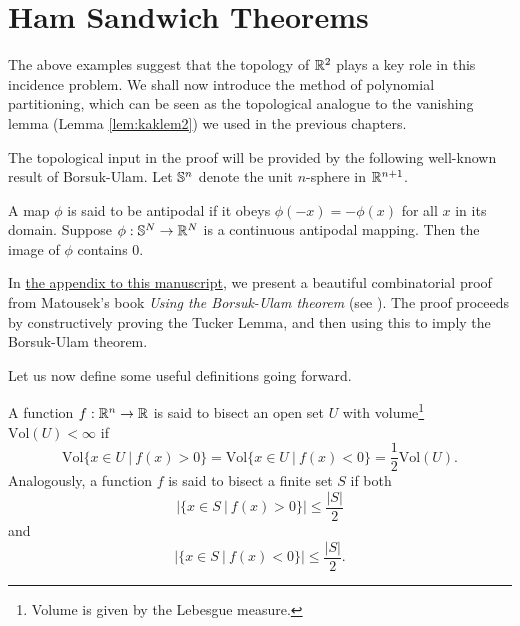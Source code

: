 \section{Ham Sandwich Theorems \label{sect:ham-sandwich-thms}}
The above examples suggest that the topology of $\mathbb R^2$ plays a key role in this incidence problem. We shall now introduce the method of polynomial partitioning,
which can be seen as the topological analogue to the vanishing lemma (Lemma \ref{lem:kaklem2}) we used in the previous chapters. 

The topological input in the proof will be provided by the following well-known result of Borsuk-Ulam.
Let $\mathbb S^n$ denote the unit $n$-sphere in $\mathbb R^{n+1}$. 
\begin{theorem}
    A map $\phi$ is said to be antipodal if it obeys $\phi (-x) = -\phi(x)$ for all $x$ in its domain. Suppose $\phi: \mathbb S^N \to \mathbb R^N$ is a continuous antipodal mapping. 
    Then the image of $\phi$ contains 0. \label{thm:Borsuk-Ulam}
\end{theorem}
In \hyperref[appendix:Borsuk-Ulam]{the appendix to this manuscript}, we present a beautiful combinatorial proof from Matousek's book \textit{Using the Borsuk-Ulam theorem} (see \cite{matouvsek2003using}).
The proof proceeds by constructively proving the Tucker Lemma, and then using this to imply the Borsuk-Ulam theorem.

Let us now define some useful definitions going forward. 
\begin{definition}
A function $f :\mathbb R^n \to \mathbb R$ is said to bisect an open set $U$ with volume\footnote{Volume is given by the Lebesgue measure.} $\text{Vol}(U) < \infty$ if
\[
    \text{Vol}\{x \in U \ | \ f(x) > 0 \} = \text{Vol}\{x \in U \ | \ f(x) < 0 \} = \frac{1}{2} \text{Vol}(U).
\]
Analogously, a function $f$ is said to bisect a finite set $S$ if both
\[
  |\{x \in S \ | \ f(x) > 0\}| \leq \frac{|S|}{2}   
\]
and 
\[
  |\{x \in S \ | \ f(x) < 0\}| \leq \frac{|S|}{2}.
\]
\end{definition}

